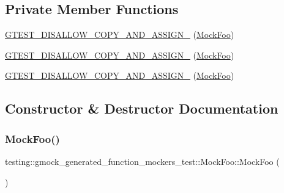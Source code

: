 \subsection*{Private Member Functions}
\begin{DoxyCompactItemize}
\item 
\mbox{\hyperlink{classtesting_1_1gmock__generated__function__mockers__test_1_1_mock_foo_a9401c622e7314948b9075b0338945cfc}{G\+T\+E\+S\+T\+\_\+\+D\+I\+S\+A\+L\+L\+O\+W\+\_\+\+C\+O\+P\+Y\+\_\+\+A\+N\+D\+\_\+\+A\+S\+S\+I\+G\+N\+\_\+}} (\mbox{\hyperlink{classtesting_1_1gmock__generated__function__mockers__test_1_1_mock_foo}{Mock\+Foo}})
\item 
\mbox{\hyperlink{classtesting_1_1gmock__generated__function__mockers__test_1_1_mock_foo_a9401c622e7314948b9075b0338945cfc}{G\+T\+E\+S\+T\+\_\+\+D\+I\+S\+A\+L\+L\+O\+W\+\_\+\+C\+O\+P\+Y\+\_\+\+A\+N\+D\+\_\+\+A\+S\+S\+I\+G\+N\+\_\+}} (\mbox{\hyperlink{classtesting_1_1gmock__generated__function__mockers__test_1_1_mock_foo}{Mock\+Foo}})
\item 
\mbox{\hyperlink{classtesting_1_1gmock__generated__function__mockers__test_1_1_mock_foo_a9401c622e7314948b9075b0338945cfc}{G\+T\+E\+S\+T\+\_\+\+D\+I\+S\+A\+L\+L\+O\+W\+\_\+\+C\+O\+P\+Y\+\_\+\+A\+N\+D\+\_\+\+A\+S\+S\+I\+G\+N\+\_\+}} (\mbox{\hyperlink{classtesting_1_1gmock__generated__function__mockers__test_1_1_mock_foo}{Mock\+Foo}})
\end{DoxyCompactItemize}


\subsection{Constructor \& Destructor Documentation}
\mbox{\label{classtesting_1_1gmock__generated__function__mockers__test_1_1_mock_foo_a05d4aeb00d75b5dbf627a5db2c0ada7f}} 
\subsubsection{\texorpdfstring{MockFoo()}{MockFoo()}\hspace{0.1cm}{\footnotesize\ttfamily [1/3]}}
{\footnotesize\ttfamily testing\+::gmock\+\_\+generated\+\_\+function\+\_\+mockers\+\_\+test\+::\+Mock\+Foo\+::\+Mock\+Foo (\begin{DoxyParamCaption}{ }\end{DoxyParamCaption})\hspace{0.3cm}{\ttfamily [inline]}}

